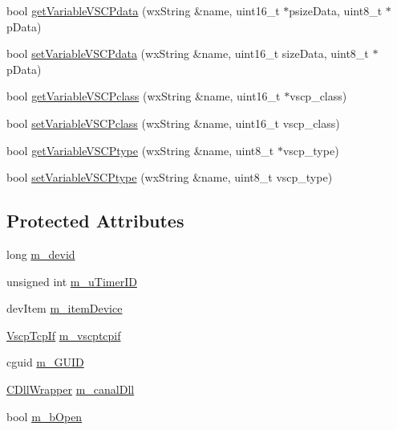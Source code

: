 \begin{DoxyCompactItemize}
\item 
bool \hyperlink{class_c_canal_super_wrapper_a3db06b705a2278bbb5d8cabe152e229d}{getVariableVSCPdata} (wxString \&name, uint16\_\-t $\ast$psizeData, uint8\_\-t $\ast$pData)
\item 
bool \hyperlink{class_c_canal_super_wrapper_a08fa8b964c1cac1f766a2071ea139086}{setVariableVSCPdata} (wxString \&name, uint16\_\-t sizeData, uint8\_\-t $\ast$pData)
\item 
bool \hyperlink{class_c_canal_super_wrapper_a369353e14f8cc21834d72353e083a992}{getVariableVSCPclass} (wxString \&name, uint16\_\-t $\ast$vscp\_\-class)
\item 
bool \hyperlink{class_c_canal_super_wrapper_a23c9289d5a9f579e5954d53bd788ae63}{setVariableVSCPclass} (wxString \&name, uint16\_\-t vscp\_\-class)
\item 
bool \hyperlink{class_c_canal_super_wrapper_aec99ac2810aa51e17e7ab3d345b48957}{getVariableVSCPtype} (wxString \&name, uint8\_\-t $\ast$vscp\_\-type)
\item 
bool \hyperlink{class_c_canal_super_wrapper_a97f97b04d5bbe9b4bd5b78cab5921f29}{setVariableVSCPtype} (wxString \&name, uint8\_\-t vscp\_\-type)
\end{DoxyCompactItemize}
\subsection*{Protected Attributes}
\begin{DoxyCompactItemize}
\item 
long \hyperlink{class_c_canal_super_wrapper_a6f16be93eed366b6e545ccf469972f29}{m\_\-devid}
\item 
unsigned int \hyperlink{class_c_canal_super_wrapper_a448eaae6cdc17ac73a2fdde17b196c41}{m\_\-uTimerID}
\item 
devItem \hyperlink{class_c_canal_super_wrapper_a93e40611475c114e967b598efb1cf237}{m\_\-itemDevice}
\item 
\hyperlink{class_vscp_tcp_if}{VscpTcpIf} \hyperlink{class_c_canal_super_wrapper_a424c1402464eb1cc2a94605a76cede4d}{m\_\-vscptcpif}
\item 
cguid \hyperlink{class_c_canal_super_wrapper_a74162ac667cb8ce2f851fe90917d1d60}{m\_\-GUID}
\item 
\hyperlink{class_c_dll_wrapper}{CDllWrapper} \hyperlink{class_c_canal_super_wrapper_a517088dbd5f8e695a336127ce68ba057}{m\_\-canalDll}
\item 
bool \hyperlink{class_c_canal_super_wrapper_aebec341755124a76eb58ca99e0e25a26}{m\_\-bOpen}
\end{DoxyCompactItemize}


